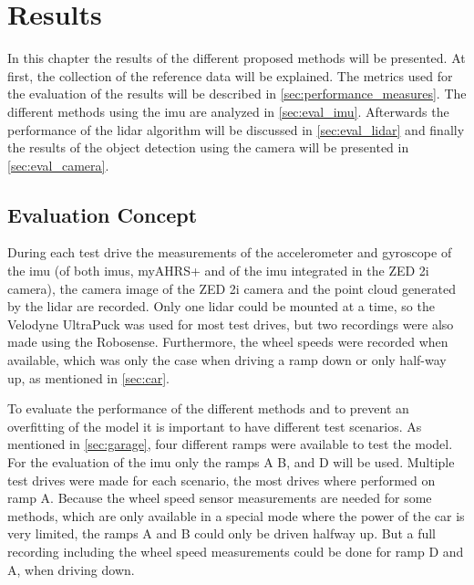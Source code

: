 \chapter{Results}
\label{ch:Results}

In this chapter the results of the different proposed methods will be presented.
At first, the collection of the reference data will be explained.
The metrics used for the evaluation of the results will be described in \cref{sec:performance_measures}.
The different methods using the \gls{imu} are analyzed in \cref{sec:eval_imu}.
Afterwards the performance of the \gls{lidar} algorithm will be discussed in \cref{sec:eval_lidar} and finally the results of the object detection using the camera will be presented in \cref{sec:eval_camera}.



\section{Evaluation Concept}
During each test drive the measurements of the accelerometer and gyroscope of the \gls{imu} (of both \glspl{imu}, myAHRS+ and of the \gls{imu} integrated in the ZED 2i camera), the camera image of the ZED 2i camera and the point cloud generated by the \gls{lidar} are recorded.
Only one \gls{lidar} could be mounted at a time, so the Velodyne UltraPuck was used for most test drives, but two recordings were also made using the Robosense.
Furthermore, the wheel speeds were recorded when available, which was only the case when driving a ramp down or only half-way up, as mentioned in \cref{sec:car}.

To evaluate the performance of the different methods and to prevent an overfitting of the model it is important to have different test scenarios.
As mentioned in \cref{sec:garage}, four different ramps were available to test the model.
For the evaluation of the \gls{imu} only the ramps A B, and D will be used.
Multiple test drives were made for each scenario, the most drives where performed on ramp A.
Because the wheel speed sensor measurements are needed for some methods, which are only available in a special mode where the power of the car is very limited, the ramps A and B could only be driven halfway up.
But a full recording including the wheel speed measurements could be done for ramp D and A, when driving down.


